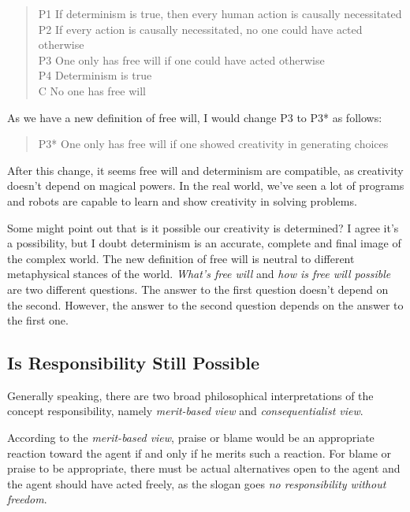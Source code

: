 \begin{quote}
 P1 If determinism is true, then every human action is causally necessitated \\
 P2 If every action is causally necessitated, no one could have acted otherwise \\
 P3 One only has free will if one could have acted otherwise \\
 P4 Determinism is true \\
 C No one has free will
\end{quote}

As we have a new definition of free will, I would change P3 to P3* as follows:

\begin{quote}
  P3* One only has free will if one showed creativity in generating choices
\end{quote}

After this change, it seems free will and determinism are compatible, as creativity doesn't depend on magical powers. In the real world, we've seen a lot of programs and robots are capable to learn and show creativity in solving problems.

Some might point out that is it possible our creativity is determined? I agree it's a possibility, but I doubt determinism is an accurate, complete and final image of the complex world. The new definition of free will is neutral to different metaphysical stances of the world. \emph{What's free will} and \emph{how is free will possible} are two different questions. The answer to the first question doesn't depend on the second. However, the answer to the second question depends on the answer to the first one.

\subsection{Is Responsibility Still Possible}

Generally speaking, there are two broad philosophical interpretations of the concept responsibility, namely \emph{merit-based view} and \emph{consequentialist view}\cite{sep-moral-responsibility}.

According to the \emph{merit-based view}, praise or blame would be an appropriate reaction toward the agent if and only if he merits such a reaction. For blame or praise to be appropriate, there must be actual alternatives open to the agent and the agent should have acted freely, as the slogan goes \emph{no responsibility without freedom}.


